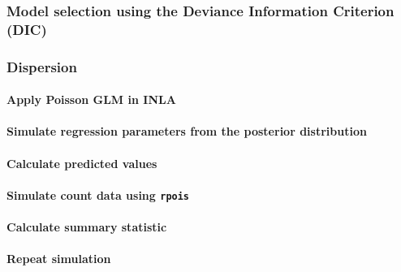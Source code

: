 \documentclass[
]{book}
\begin{document}
\hypertarget{pois-dic}{%
\subsubsection{Model selection using the Deviance Information Criterion
(DIC)}\label{pois-dic}}

\hypertarget{pois-disp}{%
\subsubsection{Dispersion}\label{pois-disp}}

\hypertarget{pois-sim}{%
\paragraph{Apply Poisson GLM in INLA}\label{pois-sim}}

\hypertarget{simulate-regression-parameters-from-the-posterior-distribution}{%
\paragraph{Simulate regression parameters from the posterior
distribution}\label{simulate-regression-parameters-from-the-posterior-distribution}}

\hypertarget{calculate-predicted-values}{%
\paragraph{Calculate predicted
values}\label{calculate-predicted-values}}

\hypertarget{simulate-count-data-using-rpois}{%
\paragraph{\texorpdfstring{Simulate count data using
\texttt{rpois}}{Simulate count data using rpois}}\label{simulate-count-data-using-rpois}}

\hypertarget{calculate-summary-statistic}{%
\paragraph{Calculate summary
statistic}\label{calculate-summary-statistic}}

\hypertarget{repeat-simulation}{%
\paragraph{Repeat simulation}\label{repeat-simulation}}
\end{document}
